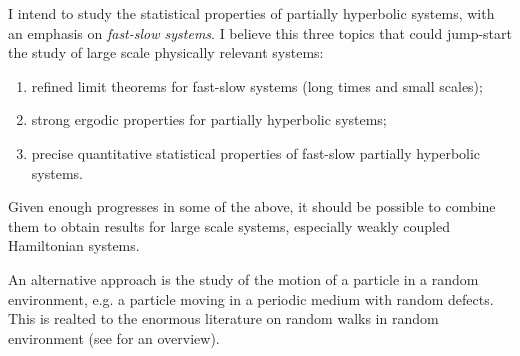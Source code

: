 \documentclass[10pt, a4paper, reqno]{amsart}
\begin{document}
I intend to study the statistical properties of partially hyperbolic systems, with an emphasis on {\em fast-slow systems}. I believe this three topics that could jump-start the study of large scale physically relevant systems:
\begin{enumerate}[(\bf 1)]
\item refined limit theorems for fast-slow systems (long times and small scales);
\item strong ergodic properties for partially hyperbolic systems;
\item precise quantitative statistical properties of fast-slow partially hyperbolic systems.
\end{enumerate}

Given enough progresses in some of the above, it should be possible to combine them to obtain results for large scale systems, especially weakly coupled Hamiltonian systems.

An alternative approach is the study of  the motion of a particle in a random environment, e.g. a particle moving in a periodic medium with random defects. This is realted to the enormous literature on random walks in random environment (see \cite{Ze04, Sz04, Ze06, DR14} for an overview).
\end{document}
